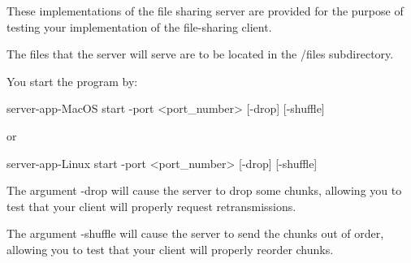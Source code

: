 These implementations of the file sharing server are provided for the
purpose of testing your implementation of the file-sharing client.

The files that the server will serve are to be located in the /files
subdirectory.

You start the program by:

   server-app-MacOS start -port <port_number> [-drop] [-shuffle]

or
 
   server-app-Linux start -port <port_number> [-drop] [-shuffle]

The argument -drop will cause the server to drop some chunks,
allowing you to test that your client will properly request 
retransmissions.

The argument -shuffle will cause the server to send the chunks
out of order, allowing you to test that your client will properly
reorder chunks.
